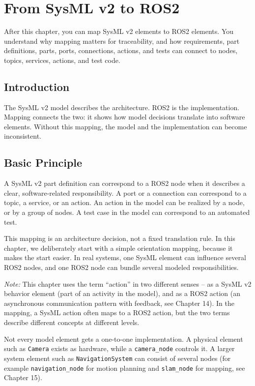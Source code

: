 \chapter{From SysML v2 to ROS2}

\begin{lernziele}
After this chapter, you can map SysML v2 elements to ROS2 elements. You understand why mapping matters for traceability, and how requirements, part definitions, parts, ports, connections, actions, and tests can connect to nodes, topics, services, actions, and test code.
\end{lernziele}

\section{Introduction}
The SysML v2 model describes the architecture. ROS2 is the implementation. Mapping connects the two: it shows how model decisions translate into software elements. Without this mapping, the model and the implementation can become inconsistent.

\section{Basic Principle}
A SysML v2 part definition can correspond to a ROS2 node when it describes a clear, software-related responsibility. A port or a connection can correspond to a topic, a service, or an action. An action in the model can be realized by a node, or by a group of nodes. A test case in the model can correspond to an automated test.

This mapping is an architecture decision, not a fixed translation rule. In this chapter, we deliberately start with a simple orientation mapping, because it makes the start easier. In real systems, one SysML element can influence several ROS2 nodes, and one ROS2 node can bundle several modeled responsibilities.

\emph{Note:} This chapter uses the term \enquote{action} in two different senses -- as a SysML v2 behavior element (part of an activity in the model), and as a ROS2 action (an asynchronous communication pattern with feedback, see Chapter 14). In the mapping, a SysML action often maps to a ROS2 action, but the two terms describe different concepts at different levels.

Not every model element gets a one-to-one implementation. A physical element such as \texttt{Camera} exists as hardware, while a \texttt{camera\_node} controls it. A larger system element such as \texttt{NavigationSystem} can consist of several nodes (for example \texttt{navigation\_node} for motion planning and \texttt{slam\_node} for mapping, see Chapter 15).

